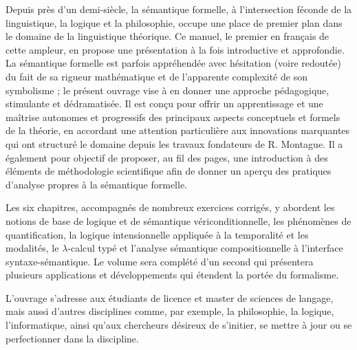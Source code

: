 
Depuis près d'un demi-siècle, la sémantique formelle, à l'intersection féconde de la linguistique, la logique et la philosophie, occupe une place de premier plan dans le domaine de la linguistique théorique.  Ce manuel, le premier en français de cette ampleur, en propose une présentation à la fois introductive et approfondie.  La sémantique formelle est parfois appréhendée avec hésitation (voire redoutée) du fait de sa rigueur mathématique et de l'apparente complexité de son symbolisme ; le présent ouvrage vise à en donner une approche pédagogique, stimulante et dédramatisée.  Il est conçu pour offrir un apprentissage et une maîtrise autonomes et progressifs des principaux aspects conceptuels et formels de la théorie, en accordant une attention particulière aux innovations marquantes qui ont structuré le domaine depuis les travaux fondateurs de R. Montague.  Il a également pour objectif de proposer, au fil des pages, une introduction à des éléments de méthodologie scientifique afin de donner un aperçu des pratiques d'analyse propres à la sémantique formelle. 

\sloppy

Les six chapitres, accompagnés de nombreux exercices corrigés, y abordent les notions de base de logique et de sémantique vériconditionnelle, les phénomènes de quantification, la logique intensionnelle appliquée à la temporalité et les modalités, le $\lambda$-calcul typé et l'analyse sémantique compositionnelle à l'interface syntaxe-sémantique.   Le volume sera complété d'un second qui présentera plusieurs applications et développements qui étendent la portée du formalisme.

\fussy

L'ouvrage s'adresse aux étudiants de licence et master de sciences de langage, mais aussi d'autres disciplines comme, par exemple, la philosophie, la logique, l'informatique, ainsi qu'aux chercheurs désireux de s'initier, se mettre à jour ou se perfectionner dans la discipline.
